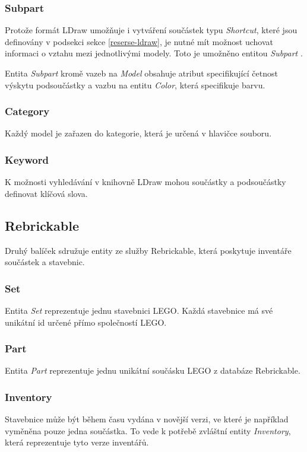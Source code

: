 \subsubsection*{Subpart}
Protože formát LDraw umožňuje i vytváření součástek typu \textit{Shortcut}, které jsou definovány v podsekci  sekce \ref{reserse-ldraw}, je nutné mít možnost uchovat informaci o vztahu mezi jednotlivými modely. Toto je umožněno entitou \textit{Subpart} . 

Entita \textit{Subpart} kromě vazeb na \textit{Model} obsahuje atribut specifikující četnost výskytu podsoučástky a vazbu na entitu \textit{Color}, která specifikuje barvu. 

\subsubsection*{Category}
Každý model je zařazen do kategorie, která je určená v hlavičce souboru.

\subsubsection*{Keyword}
K možnosti vyhledávání v knihovně LDraw mohou součástky a podsoučástky definovat klíčová slova.

\subsection{Rebrickable}
Druhý balíček sdružuje entity ze služby Rebrickable, která poskytuje inventáře součástek a stavebnic.

\subsubsection*{Set}
Entita \textit{Set} reprezentuje jednu stavebnici LEGO. Každá stavebnice má své unikátní id určené přímo společností LEGO. 

\subsubsection*{Part}
Entita \textit{Part} reprezentuje jednu unikátní součásku LEGO z databáze Rebrickable.

\subsubsection*{Inventory}
Stavebnice může být během času vydána v novější verzi, ve které je například vyměněna pouze jedna součástka. To vede k potřebě zvláštní entity \textit{Inventory}, která reprezentuje tyto verze inventářů. 

